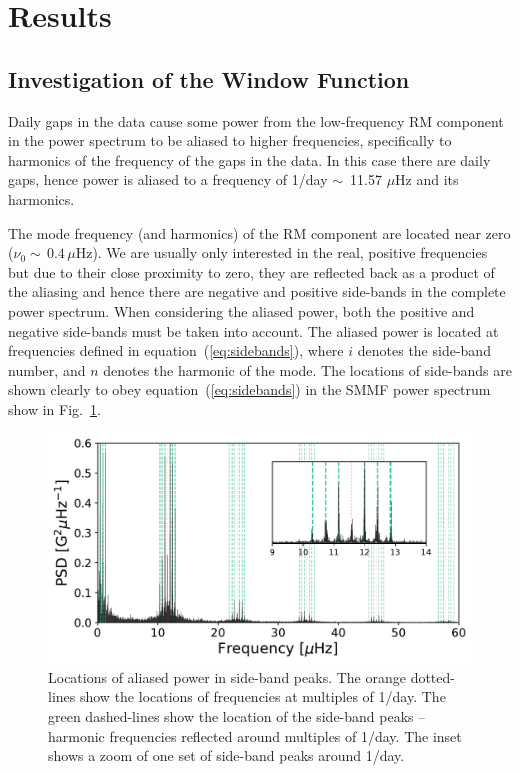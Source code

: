 \section{Results}\label{sec:SMMF_reults}

\subsection{Investigation of the Window Function}\label{sec:window_fn}


Daily gaps in the data cause some power from the low-frequency RM component in the power spectrum to be aliased to higher frequencies, specifically to harmonics of the frequency of the gaps in the data. In this case there are daily gaps, hence power is aliased to a frequency of 1/day $\sim$~11.57 $\mu$Hz and its harmonics.

The mode frequency (and harmonics) of the RM component are located near zero ($\nu_0 \sim \,0.4 \, \mu\mathrm{Hz}$). We are usually only interested in the real, positive frequencies but due to their close proximity to zero, they are reflected back as a product of the aliasing and hence there are negative and positive side-bands in the complete power spectrum. When considering the aliased power, both the positive and negative side-bands must be taken into account. The aliased power is located at frequencies defined in equation~(\ref{eq:sidebands}), where $i$ denotes the side-band number, and $n$ denotes the harmonic of the mode. The locations of side-bands are shown clearly to obey equation~(\ref{eq:sidebands}) in the SMMF power spectrum show in Fig.~\ref{fig:sideband_locations}.

\begin{figure}[ht!]
	\centering
	\includegraphics[width=\columnwidth]{sideband.pdf}
	\caption{Locations of aliased power in side-band peaks. The orange dotted-lines show the locations of frequencies at multiples of 1/day. The green dashed-lines show the location of the side-band peaks -- harmonic frequencies reflected around multiples of 1/day.  The inset shows a zoom of one set of side-band peaks around 1/day.}
	\label{fig:sideband_locations}
\end{figure}


